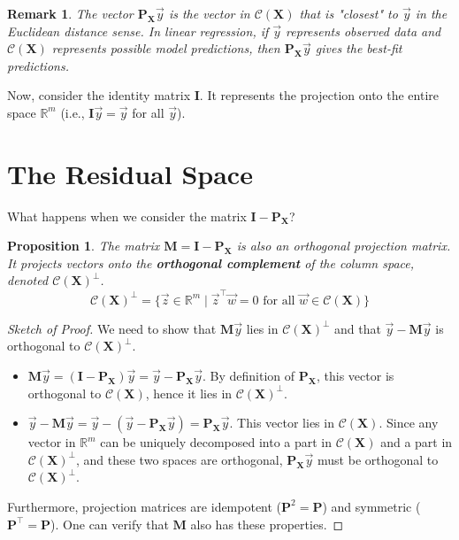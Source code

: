 \documentclass[11pt]{article}
\newcommand{\mat}[1]{\mathbf{#1}} %
\newcommand{\vecspace}[1]{\mathcal{#1}} %
\newcommand{\colspace}[1]{\vecspace{C}(#1)} %
\newcommand{\transpose}[1]{#1^{\top}} %
\newcommand{\proj}[1]{\mat{P}_{#1}} %
\newcommand{\identity}{\mat{I}} %
\newcommand{\realnums}{\mathbb{R}} %
\newtheorem{proposition}{Proposition}
\newtheorem{remark}{Remark}
\begin{document}
\begin{remark}
The vector $\proj{\mat{X}}\vec{y}$ is the vector in $\colspace{\mat{X}}$ that is "closest" to $\vec{y}$ in the Euclidean distance sense. In linear regression, if $\vec{y}$ represents observed data and $\colspace{\mat{X}}$ represents possible model predictions, then $\proj{\mat{X}}\vec{y}$ gives the best-fit predictions.
\end{remark}

Now, consider the identity matrix $\identity$. It represents the projection onto the entire space $\realnums^m$ (i.e., $\identity \vec{y} = \vec{y}$ for all $\vec{y}$).

\section{The Residual Space}

What happens when we consider the matrix $\identity - \proj{\mat{X}}$?

\begin{proposition}
The matrix $\mat{M} = \identity - \proj{\mat{X}}$ is also an orthogonal projection matrix. It projects vectors onto the \textbf{orthogonal complement} of the column space, denoted $\colspace{\mat{X}}^{\perp}$.
\[ \colspace{\mat{X}}^{\perp} = \{ \vec{z} \in \realnums^m \mid \transpose{\vec{z}}\vec{w} = 0 \text{ for all } \vec{w} \in \colspace{\mat{X}} \} \]
\end{proposition}

\begin{proof}[Sketch of Proof]
We need to show that $\mat{M}\vec{y}$ lies in $\colspace{\mat{X}}^{\perp}$ and that $\vec{y} - \mat{M}\vec{y}$ is orthogonal to $\colspace{\mat{X}}^{\perp}$.
\begin{itemize}
    \item $\mat{M}\vec{y} = (\identity - \proj{\mat{X}})\vec{y} = \vec{y} - \proj{\mat{X}}\vec{y}$. By definition of $\proj{\mat{X}}$, this vector is orthogonal to $\colspace{\mat{X}}$, hence it lies in $\colspace{\mat{X}}^{\perp}$.
    \item $\vec{y} - \mat{M}\vec{y} = \vec{y} - (\vec{y} - \proj{\mat{X}}\vec{y}) = \proj{\mat{X}}\vec{y}$. This vector lies in $\colspace{\mat{X}}$. Since any vector in $\realnums^m$ can be uniquely decomposed into a part in $\colspace{\mat{X}}$ and a part in $\colspace{\mat{X}}^{\perp}$, and these two spaces are orthogonal, $\proj{\mat{X}}\vec{y}$ must be orthogonal to $\colspace{\mat{X}}^{\perp}$.
\end{itemize}
Furthermore, projection matrices are idempotent ($\mat{P}^2 = \mat{P}$) and symmetric ($\transpose{\mat{P}} = \mat{P}$). One can verify that $\mat{M}$ also has these properties.
\end{proof}
\end{document}
